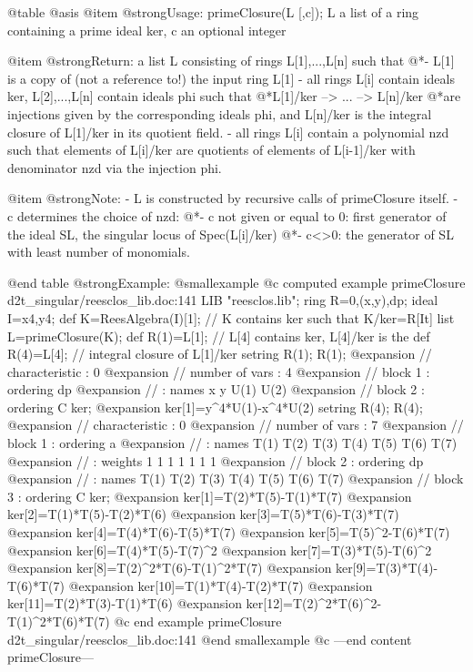 @table @asis
@item @strong{Usage:}
primeClosure(L [,c]); L a list of a ring containing a prime ideal
ker, c an optional integer

@item @strong{Return:}
a list L consisting of rings L[1],...,L[n] such that
@*- L[1] is a copy of (not a reference to!) the input ring L[1]
- all rings L[i] contain ideals ker, L[2],...,L[n] contain ideals phi
such that
@*L[1]/ker --> ... --> L[n]/ker
@*are injections given by the corresponding ideals phi, and L[n]/ker
is the integral closure of L[1]/ker in its quotient field.
- all rings L[i] contain a polynomial nzd such that elements of
L[i]/ker are quotients of elements of L[i-1]/ker with denominator
nzd via the injection phi.

@item @strong{Note:}
- L is constructed by recursive calls of primeClosure itself.
- c determines the choice of nzd:
@*- c not given or equal to 0: first generator of the ideal SL,
the singular locus of Spec(L[i]/ker)
@*- c<>0: the generator of SL with least number of monomials.

@end table
@strong{Example:}
@smallexample
@c computed example primeClosure d2t_singular/reesclos_lib.doc:141 
LIB "reesclos.lib";
ring R=0,(x,y),dp;
ideal I=x4,y4;
def K=ReesAlgebra(I)[1];        // K contains ker such that K/ker=R[It]
list L=primeClosure(K);
def R(1)=L[1];                  // L[4] contains ker, L[4]/ker is the
def R(4)=L[4];                  // integral closure of L[1]/ker
setring R(1);
R(1);
@expansion{} //   characteristic : 0
@expansion{} //   number of vars : 4
@expansion{} //        block   1 : ordering dp
@expansion{} //                  : names    x y U(1) U(2) 
@expansion{} //        block   2 : ordering C
ker;
@expansion{} ker[1]=y^4*U(1)-x^4*U(2)
setring R(4);
R(4);
@expansion{} //   characteristic : 0
@expansion{} //   number of vars : 7
@expansion{} //        block   1 : ordering a
@expansion{} //                  : names    T(1) T(2) T(3) T(4) T(5) T(6) T(7) 
@expansion{} //                  : weights     1    1    1    1    1    1    1 
@expansion{} //        block   2 : ordering dp
@expansion{} //                  : names    T(1) T(2) T(3) T(4) T(5) T(6) T(7) 
@expansion{} //        block   3 : ordering C
ker;
@expansion{} ker[1]=T(2)*T(5)-T(1)*T(7)
@expansion{} ker[2]=T(1)*T(5)-T(2)*T(6)
@expansion{} ker[3]=T(5)*T(6)-T(3)*T(7)
@expansion{} ker[4]=T(4)*T(6)-T(5)*T(7)
@expansion{} ker[5]=T(5)^2-T(6)*T(7)
@expansion{} ker[6]=T(4)*T(5)-T(7)^2
@expansion{} ker[7]=T(3)*T(5)-T(6)^2
@expansion{} ker[8]=T(2)^2*T(6)-T(1)^2*T(7)
@expansion{} ker[9]=T(3)*T(4)-T(6)*T(7)
@expansion{} ker[10]=T(1)*T(4)-T(2)*T(7)
@expansion{} ker[11]=T(2)*T(3)-T(1)*T(6)
@expansion{} ker[12]=T(2)^2*T(6)^2-T(1)^2*T(6)*T(7)
@c end example primeClosure d2t_singular/reesclos_lib.doc:141
@end smallexample
@c ---end content primeClosure---

